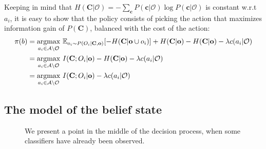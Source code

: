 \documentclass[runningheads]{llncs}
\begin{document}
Keeping in mind that $ H(\mathbf{C}|\mathcal{O}) = -\sum_{\mathbf{c}} P(\mathbf{c}|\mathcal{O}) \log P(\mathbf{c}|\mathcal{O}) $ is constant w.r.t $a_i$, it is easy to show that the policy consists of picking the action that maximizes information gain of $P(\mathbf{C})$, balanced with the cost of the action:
\begin{align}
\pi(b)
&= \argmax_{a_i \in \mathcal{A} \setminus \mathcal{O}} \, \mathbb{E}_{o_i \sim P(O_i|\mathbf{C},\mathbf{o})}[-H(\mathbf{C}|\mathbf{o} \cup o_i)] + H(\mathbf{C}|\mathbf{o}) - H(\mathbf{C}|\mathbf{o}) - \lambda c(a_i|\mathcal{O}) \\
&= \argmax_{a_i \in \mathcal{A} \setminus \mathcal{O}} \, I(\mathbf{C};O_i|\mathbf{o}) - H(\mathbf{C}|\mathbf{o}) - \lambda c(a_i|\mathcal{O}) \\
&= \argmax_{a_i \in \mathcal{A} \setminus \mathcal{O}} \, I(\mathbf{C};O_i|\mathbf{o}) - \lambda c(a_i|\mathcal{O})
\end{align}

\subsection{The model of the belief state}
\begin{figure}[h!]
\centering
{}
\caption{We present a point in the middle of the decision process, when some classifiers have already been observed.}
\label{fig:model}
\end{figure}
\end{document}
